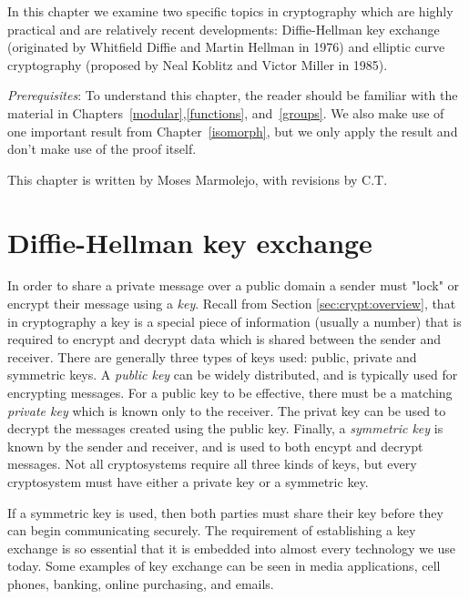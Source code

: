 
In this chapter we examine two specific topics in cryptography which are highly practical and are relatively recent developments: Diffie-Hellman key exchange (originated by Whitfield Diffie and Martin Hellman in 1976) and elliptic curve cryptography (proposed by Neal Koblitz and Victor Miller in 1985).
\medskip

\noindent
\emph{Prerequisites}: 
To understand this chapter, the reader should be familiar with the material in  Chapters~\ref{modular},\ref{functions}, and~\ref{groups}. We also make use of one important result from Chapter~\ref{isomorph}, but we only apply the result and don't make use of the proof itself.  
\bigskip

This chapter is written by Moses Marmolejo, with revisions by C.T.

\section{Diffie-Hellman key exchange}\label{sec:DHKE:1}

In order to share a private message over a public domain a sender must  "lock" or encrypt their message using a \emph{key}.  Recall from Section \ref{sec:crypt:overview}, that in cryptography a  key is a special piece of information (usually a number)  that is required to encrypt and decrypt data which is shared between the sender and receiver. There are generally three types of keys used: public, private and symmetric keys. A \emph{public key} can be widely distributed, and is typically used for encrypting messages.  For a public key to be effective, there must be a matching \emph{private key} which is known only to the receiver. The privat key can be used to decrypt the messages created using the public key.  Finally, a \emph{symmetric key} is known by the sender and receiver, and is used to both encypt and decrypt messages.  Not all cryptosystems require all three kinds of keys, but every cryptosystem must have either a private key or a symmetric key.

  If a symmetric key is used, then both parties must share their key before they can begin communicating securely. The requirement of establishing a key exchange is so essential that it is embedded into almost every technology we use today.  Some examples of key exchange can be seen in media applications, cell phones, banking, online purchasing, and emails.  

